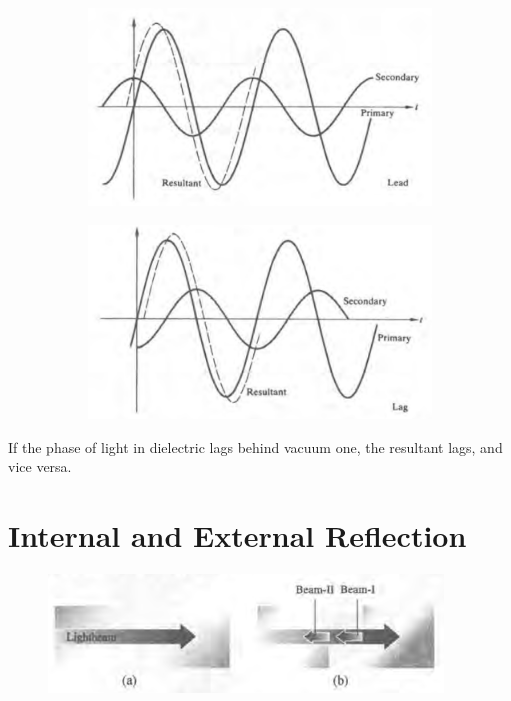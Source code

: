 \begin{figure}[H]
  \centering
  \begin{subfigure}{.45\textwidth}
    \centering
    \includegraphics[width=\linewidth]{figures/Light-speed-in-dielectric1.png}
  \end{subfigure}
  \begin{subfigure}{.45\textwidth}
    \centering
    \includegraphics[width=\linewidth]{figures/Light-speed-in-dielectric2.png}
  \end{subfigure}
\end{figure}


If the phase of light in dielectric lags behind vacuum one, the resultant lags, and vice versa.

\section{Internal and External Reflection}

\begin{figure}[H]
  \centering
  \includegraphics[width=0.8\linewidth]{figures/internal-external-reflection}
\end{figure}

